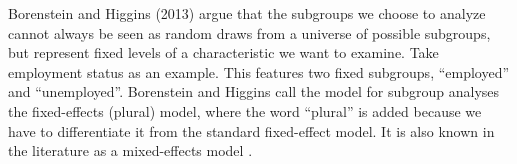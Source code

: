 \documentclass[../../../main.tex]{subfiles}
\begin{document}
Borenstein and Higgins (2013) argue that the subgroups we choose to analyze cannot always be seen as random draws from a universe of possible subgroups, but represent fixed levels of a characteristic we want to examine. Take employment status as an example. This features two fixed subgroups, ``employed'' and ``unemployed''. Borenstein and Higgins call the model for subgroup analyses the fixed-effects (plural) model, where the word ``plural'' is added because we have to differentiate it from the standard fixed-effect model. It is also known in the literature as a mixed-effects model \autocite{Harrer2021}.
\end{document}
